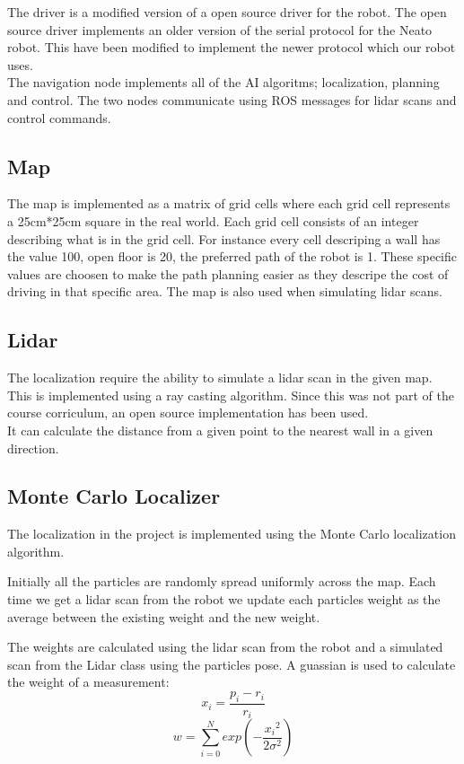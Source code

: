 The driver is a modified version of a open source driver for the robot. 
The open source driver implements an older version of the serial protocol for the Neato robot.
This have been modified to implement the newer protocol which our robot uses.\\

The navigation node implements all of the AI algoritms; localization, planning and control.
The two nodes communicate using ROS messages for lidar scans and control commands. 

\subsection{Map}
The map is implemented as a matrix of grid cells where each grid cell represents a 25cm*25cm square in the real world.
Each grid cell consists of an integer describing what is in the grid cell. For instance every cell descriping a wall has the value 100, open floor is 20, the preferred path of the robot is 1.
These specific values are choosen to make the path planning easier as they descripe the cost of driving in that specific area.
The map is also used when simulating lidar scans.

\subsection{Lidar}
The localization require the ability to simulate a lidar scan in the given map.
This is implemented using a ray casting algorithm.
Since this was not part of the course corriculum, an open source implementation has been used.\\

It can calculate the distance from a given point to the nearest wall in a given direction.

\subsection{Monte Carlo Localizer}
The localization in the project is implemented using the Monte Carlo localization algorithm.

Initially all the particles are randomly spread uniformly across the map.
Each time we get a lidar scan from the robot we update each particles weight as the average between the existing weight and the new weight.

The weights are calculated using the lidar scan from the robot and a simulated scan from the Lidar class using the particles pose.
A guassian is used to calculate the weight of a measurement:
$$x_i = \frac{p_i - r_i}{r_i}$$
$$w = \sum_{i=0}^N exp\left(-\frac{{x_i}^2}{2\sigma^2}\right)$$

